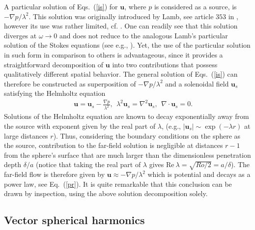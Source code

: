 \documentclass[aps,prx,twocolumn,amsmath,amssymb,amsfonts]{revtex4-2}
\newcommand{\rRe}{\mathrm{Re}}
\begin{document}
A particular solution of Eqs.~(\ref{is}) for $\bm u$, where $p$ is considered as a source, is $-\nabla p/\lambda^{2}$. This solution was originally introduced by Lamb, see article $353$ in \cite{Lamb}, however its use was rather limited, cf. \cite{pala,Yang}. One can readily see that this solution diverges at $\omega\to 0$ and does not reduce to the analogous Lamb's particular solution of the Stokes equations (see e.g., \cite{kim}).  Yet, the use of the particular solution in such form in comparison to others is advantageous, since it provides a straightforward decomposition of $\bm u$ into two contributions that possess qualitatively different spatial behavior. The general solution of Eqs.~(\ref{is}) can therefore be constructed as superposition of $-\nabla p/\lambda^{2}$ and a solenoidal field $\bm u_s$ satisfying the Helmholtz equation \cite{Lamb}
\begin{eqnarray}&&\!\!\!\!\!\!\!\!\!\!\!\!\!\!\!\!
\bm u=\bm u_s-\frac{\nabla p}{\lambda^2}, \ \
\lambda^{2}\bm u_s\!=\! \nabla^2\bm u_s,\ \ \nabla\!\cdot\!\bm u_s\!=\!0. \label{helm}
\end{eqnarray}
Solutions of the Helmholtz equation are known to decay exponentially away from the source with exponent given by the real part of $\lambda$, (e.g., $|\bm u_s|\sim \exp(-\lambda r)$ at large distances $r$). Thus, considering the boundary conditions on the sphere as the source, contribution to the far-field solution is negligible at distances $r-1$ from the sphere's surface that are much larger than the dimensionless penetration depth $\delta/a$ (notice that taking the real part of $\lambda$ gives $\rRe\ \lambda=\sqrt{Ro/2}=a/\delta$). The far-field flow is therefore given by $\bm u\approx -\nabla p/\lambda^{2}$ which is potential and decays as a power law, see Eq.~(\ref{pr}). It is quite remarkable that this conclusion can be drawn by inspection, using the above solution decomposition solely.

\subsection{Vector spherical harmonics}
\end{document}
